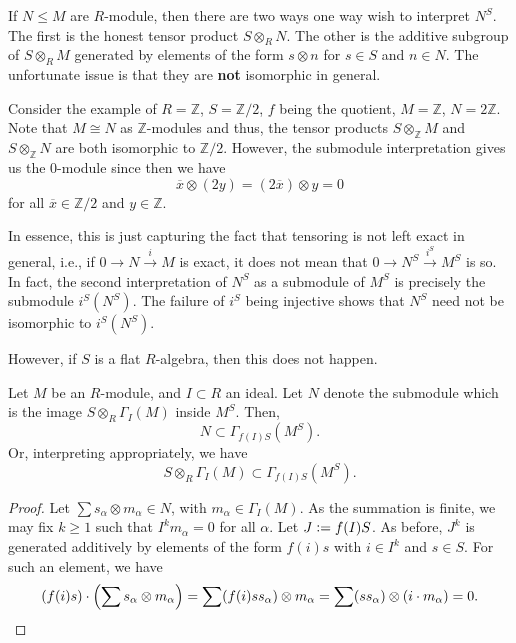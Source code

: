 \begin{rem}
	If $N \le M$ are $R$-module, then there are two ways one way wish to interpret $N^{S}$. The first is the honest tensor product $S \otimes_{R} N$. The other is the additive subgroup of $S \otimes_{R} M$ generated by elements of the form $s \otimes n$ for $s \in S$ and $n \in N$. \newline
	The unfortunate issue is that they are \textbf{not} isomorphic in general. 

	Consider the example of $R = \mathbb{Z}$, $S = \mathbb{Z}/2$, $f$ being the quotient, $M = \mathbb{Z}$, $N = 2\mathbb{Z}$. Note that $M \cong N$ as $\mathbb{Z}$-modules and thus, the tensor products $S \otimes_{\mathbb{Z}} M$ and $S \otimes_{\mathbb{Z}} N$ are both isomorphic to $\mathbb{Z}/2$. However, the submodule interpretation gives us the $0$-module since then we have
	\begin{equation*} 
		\overline{x} \otimes (2y) = (2 \overline{x}) \otimes y = 0
	\end{equation*}
	for all $\overline{x} \in \mathbb{Z}/2$ and $y \in \mathbb{Z}$.

	In essence, this is just capturing the fact that tensoring is not left exact in general, i.e., if $0 \to N \xrightarrow{i} M$ is exact, it does not mean that $0 \to N^{S} \xrightarrow{i^{S}} M^{S}$ is so. In fact, the second interpretation of $N^{S}$ as a submodule of $M^{S}$ is precisely the submodule $i^{S}(N^{S})$. The failure of $i^{S}$ being injective shows that $N^{S}$ need not be isomorphic to $i^{S}(N^{S})$.

	However, if $S$ is a flat $R$-algebra, then this does not happen.
\end{rem}

\begin{prop}
	Let $M$ be an $R$-module, and $I \subset R$ an ideal. Let $N$ denote the submodule which is the image $S \otimes_{R} \Gamma_{I}(M)$ inside $M^{S}$. Then,
	\begin{equation*} 
		N \subset \Gamma_{f(I)S}(M^{S}).
	\end{equation*}
	Or, interpreting appropriately, we have
	\begin{equation*} 
		S \otimes_{R} \Gamma_{I}(M) \subset \Gamma_{f(I)S}(M^{S}).
	\end{equation*}
\end{prop}
\begin{proof} 
	Let $\sum s_{\alpha} \otimes m_{\alpha} \in N$, with $m_{\alpha} \in \Gamma_{I}(M)$. As the summation is finite, we may fix $k \ge 1$ such that $I^{k} m_{\alpha} = 0$ for all $\alpha$. Let $J \vcentcolon= f(I)S$. As before, $J^{k}$ is generated additively by elements of the form $f(i) s$ with $i \in I^{k}$ and $s \in S$. For such an element, we have
	\begin{equation*} 
		(f(i) s) \cdot \left(\sum s_{\alpha} \otimes m_{\alpha}\right) = \sum (f(i) s s_{\alpha}) \otimes m_{\alpha} = \sum (ss_{\alpha}) \otimes (i \cdot m_{\alpha}) = 0. \qedhere
	\end{equation*}
\end{proof}

